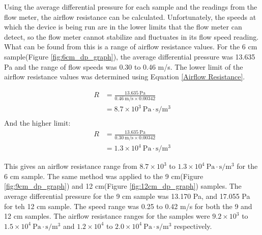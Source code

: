 	Using the average differential pressure for each sample and the readings from the 
flow meter, the airflow resistance can be calculated. Unfortunately, the speeds at which the 
device is being run are in the lower limits that the flow meter can detect, so the flow meter 
cannot stabilize and fluctuates in its flow speed reading. What can be found from this is a 
range of airflow resistance values. For the 6 cm sample(Figure \ref{fig:6cm_dp_graph}), the 
average differential pressure was 13.635 Pa and the range of flow speeds was 0.30 to 0.46 
m/s. The lower limit of the airflow resistance values was determined using Equation 
\ref{Airflow Resistance}. 

\begin{align}
R &= \frac{13.635\ \mathrm{Pa}}{0.46\ \mathrm{m/s} \times 0.00342} \\
  &= 8.7 \times 10^3\ \mathrm{Pa\cdot s/m^3}\\
\end{align}
And the higher limit:
\begin{align}
R &= \frac{13.635\ \mathrm{Pa}}{0.30\ \mathrm{m/s} \times 0.00342} \\
  &= 1.3 \times 10^4\ \mathrm{Pa\cdot s/m^3} 
\end{align}

This gives an airflow resistance range from $8.7 \times 10^3$ to $1.3 \times 10^4\ 
\mathrm{Pa\cdot s/m^3}$ for the 6 cm sample.
	The same method was applied to the 9 cm(Figure \ref{fig:9cm_dp_graph}) and 12 
cm(Figure \ref{fig:12cm_dp_graph}) samples. The average differential pressure for the 9 cm 
sample was 13.170 Pa, and 17.055 Pa for teh 12 cm sample. The speed range was 0.25 to 0.42 
m/s for both the 9 and 12 cm samples. The airflow resistance ranges for the samples were $9.2 
\times 10^3$ to $1.5 \times 10^4\ \mathrm{Pa\cdot s/m^3}$ and $1.2 \times 10^4$ to $2.0 
\times 10^4\ \mathrm{Pa\cdot s/m^3}$ respectively.

 
